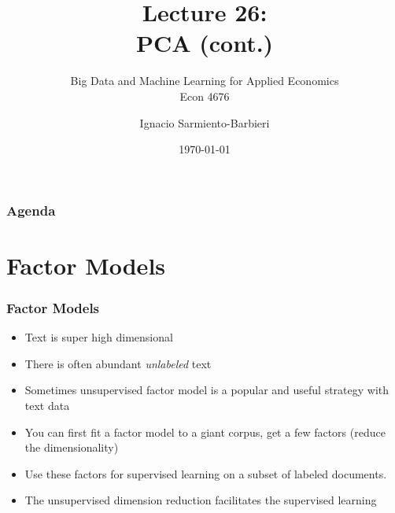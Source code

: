 \documentclass[
  shownotes,
  xcolor={svgnames},
  hyperref={colorlinks,citecolor=DarkBlue,linkcolor=DarkRed,urlcolor=DarkBlue}
  , aspectratio=169]{beamer}
\begin{document}
\title[Lecture 26]{Lecture 26: \\ PCA (cont.) }
\subtitle{Big Data and Machine Learning for Applied Economics \\ Econ 4676}
\date{\today}

\author[Sarmiento-Barbieri]{Ignacio Sarmiento-Barbieri}


\begin{frame}[noframenumbering]
\maketitle
\end{frame}







\begin{frame}
\frametitle{Agenda}

\tableofcontents

\end{frame}

\section{Factor Models}


\begin{frame}
\frametitle{Factor Models}

\begin{itemize}
\item Text is super high dimensional
\medskip
\item There is often abundant {\it unlabeled} text
\medskip
\item Sometimes unsupervised factor model is a popular and useful strategy with text data
\medskip
\item You can first fit a factor model to a giant corpus, get a few factors (reduce the dimensionality)
\medskip
\item Use these factors for supervised learning on a subset of labeled documents.
\medskip
\item The unsupervised dimension reduction facilitates the supervised learning
\end{itemize}
\end{frame}
\end{document}
